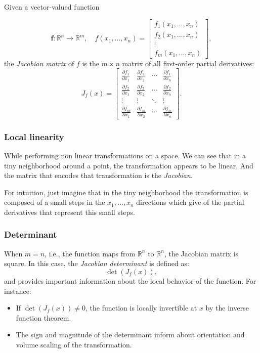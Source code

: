 Given a vector-valued function

\[
\mathbf{f} : \mathbb{R}^n \rightarrow \mathbb{R}^m, \quad f(x_1, \ldots, x_n) = 
\begin{bmatrix}
f_1(x_1, \ldots, x_n) \\
f_2(x_1, \ldots, x_n) \\
\vdots \\
f_m(x_1, \ldots, x_n)
\end{bmatrix},
\]
the \emph{Jacobian matrix} of \(f\) is the \(m \times n\) matrix of all first-order partial derivatives:
\[
J_f(x) = \begin{bmatrix}
\frac{\partial f_1}{\partial x_1} & \frac{\partial f_1}{\partial x_2} & \cdots & \frac{\partial f_1}{\partial x_n} \\
\frac{\partial f_2}{\partial x_1} & \frac{\partial f_2}{\partial x_2} & \cdots & \frac{\partial f_2}{\partial x_n} \\
\vdots & \vdots & \ddots & \vdots \\
\frac{\partial f_m}{\partial x_1} & \frac{\partial f_m}{\partial x_2} & \cdots & \frac{\partial f_m}{\partial x_n}
\end{bmatrix}.
\]

\subsubsection{Local linearity}
While performing non linear transformations on a space. We can see that in a tiny neighborhood
around a point, the transformation appears to be linear. And the matrix that encodes that
transformation is the \emph{Jacobian}.

For intuition, just imagine that in the tiny neighborhood the transformation is composed
of a small steps in the \(x_1, \dots, x_n\) directions which give of the partial derivatives that
represent this small steps. 

\subsubsection{Determinant}
When \(m = n\), i.e., the function maps from 
\(\mathbb{R}^n\) to \(\mathbb{R}^n\), 
the Jacobian matrix is square. In this case, 
the \textit{Jacobian determinant} is defined as:
\[
\det(J_{f}(x)),
\]
and provides important information about the local behavior of the function. For instance:
\begin{itemize}[label=\(-\)]
  \item If \(\det(J_{f}(x)) \neq 0\), the function is locally invertible at \(x\) by the inverse 
  function theorem.
  \item The sign and magnitude of the determinant 
  inform about orientation and volume scaling of the transformation.
\end{itemize}

